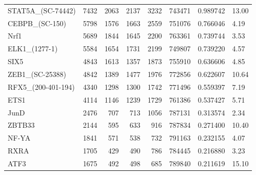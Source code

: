 \begin{table}
\begin{tabular}{lrrrrrrl}
STAT5A\_(SC-74442) & 7432 & 2063 & 2137 & 3232 & 743471 & 0.989742 & 13.00 \\
CEBPB\_(SC-150) & 5798 & 1576 & 1663 & 2559 & 751076 & 0.766046 & 4.19 \\
Nrf1 & 5689 & 1844 & 1645 & 2200 & 763361 & 0.739744 & 3.53 \\
ELK1\_(1277-1) & 5584 & 1654 & 1731 & 2199 & 749807 & 0.739220 & 4.57 \\
SIX5 & 4843 & 1613 & 1357 & 1873 & 755910 & 0.636606 & 4.85 \\
ZEB1\_(SC-25388) & 4842 & 1389 & 1477 & 1976 & 772856 & 0.622607 & 10.64 \\
RFX5\_(200-401-194) & 4340 & 1298 & 1300 & 1742 & 771496 & 0.559397 & 7.19 \\
ETS1 & 4114 & 1146 & 1239 & 1729 & 761386 & 0.537427 & 5.71 \\
JunD & 2476 & 707 & 713 & 1056 & 787131 & 0.313574 & 2.34 \\
ZBTB33 & 2144 & 595 & 633 & 916 & 787834 & 0.271400 & 10.40 \\
NF-YA & 1841 & 571 & 538 & 732 & 791163 & 0.232155 & 4.07 \\
RXRA & 1705 & 429 & 490 & 786 & 784445 & 0.216880 & 3.23 \\
ATF3 & 1675 & 492 & 498 & 685 & 789840 & 0.211619 & 15.10 \\
\bottomrule
\end{tabular}
\end{table}
